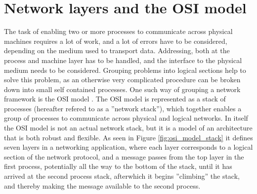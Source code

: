 \section{Network layers and the OSI model}
The task of enabling two or more processes to communicate across physical machines requires a lot of work, and a lot of errors have to be considered, depending on the medium used to transport data. Addressing, both at the process and machine layer has to be handled, and the interface to the physical medium needs to be considered. Grouping problems into logical sections help to solve this problem, as an otherwise very complicated procedure can be broken down into small self contained processes.
One such way of grouping a network framework is the OSI model \cite[27-42]{KOM}. The OSI model is represented as a stack of processes (hereafter refered to as a ''network stack''), which together enables a group of processes to communicate across physical and logical networks.
In itself the OSI model is not an actual network stack, but it is a model of an architecture that is both robust and flexible. 
As seen in Figure \ref{fig:osi_model_stack} it defines seven layers in a networking application, where each layer corresponds to a logical section of the network protocol, and a message passes from the top layer in the first process, potentially all the way to the bottom of the stack, until it has arrived at the second process stack, afterwhich it begins ''climbing'' the stack, and thereby making the message available to the second process.

